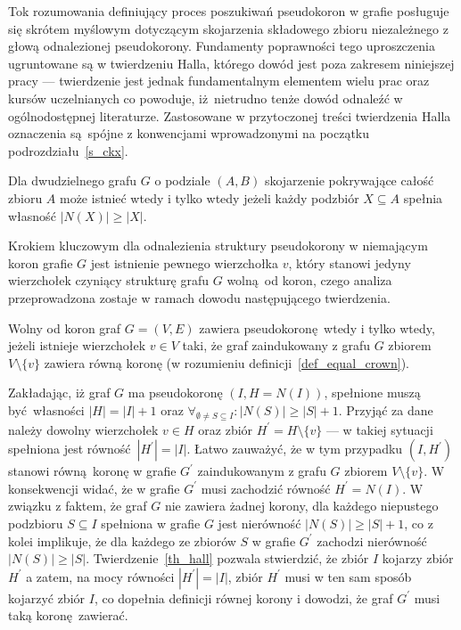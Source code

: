 \par{
  Tok rozumowania definiujący proces poszukiwań pseudokoron w grafie posługuje się skrótem myślowym dotyczącym skojarzenia składowego zbioru niezależnego z głową odnalezionej pseudokorony. 
  Fundamenty poprawności tego uproszczenia ugruntowane są w twierdzeniu Halla, którego dowód jest poza zakresem niniejszej pracy --- twierdzenie jest jednak fundamentalnym elementem wielu prac oraz kursów uczelnianych co powoduje, iż nietrudno tenże dowód odnaleźć w ogólnodostępnej literaturze.
  Zastosowane w przytoczonej treści twierdzenia Halla oznaczenia są spójne z konwencjami wprowadzonymi na początku podrozdziału~\ref{s_ckx}.
  \begin{theorem}
    Dla dwudzielnego grafu $G$ o podziale $(A, B)$ skojarzenie pokrywające całość zbioru $A$ może istnieć wtedy i tylko wtedy jeżeli każdy podzbiór $X \subseteq A$ spełnia własność $|N(X)| \geq |X|$.
  \end{theorem}

  Krokiem kluczowym dla odnalezienia struktury pseudokorony w niemającym koron grafie $G$ jest istnienie pewnego wierzchołka $v$, który stanowi jedyny wierzchołek czyniący strukturę grafu $G$ wolną od koron, czego analiza przeprowadzona zostaje w ramach dowodu następującego twierdzenia.

  \begin{theorem}
    Wolny od koron graf $G=(V, E)$ zawiera pseudokoronę wtedy i tylko wtedy, jeżeli istnieje wierzchołek $v \in V$ taki, że graf zaindukowany z grafu $G$ zbiorem $V\setminus \{v\}$ zawiera równą koronę (w rozumieniu definicji~\ref{def_equal_crown}).
  \end{theorem}
  \begin{bproof}
    Zakładając, iż graf $G$ ma pseudokoronę $(I, H=N(I))$, spełnione muszą być własności $|H| = |I| + 1$ oraz $\forall_{\emptyset\neq S \subseteq I}:{|N(S)|\geq|S|+1}$.
    Przyjąć za dane należy dowolny wierzchołek $v \in H$ oraz zbiór $H^\prime=H \setminus \{v\}$ --- w takiej sytuacji spełniona jest równość $|H^\prime|=|I|$.
    Łatwo zauważyć, że w tym przypadku $(I, H^\prime)$ stanowi równą koronę w grafie $G^\prime$ zaindukowanym z grafu $G$ zbiorem $V \setminus \{v\}$.
    W konsekwencji widać, że w grafie $G^\prime$ musi zachodzić równość $H^\prime = N(I)$.
    W związku z faktem, że graf $G$ nie zawiera żadnej korony, dla każdego niepustego podzbioru $S \subseteq I$ spełniona w grafie $G$ jest nierówność $|N(S)| \geq |S|+1$, co z kolei implikuje, że dla każdego ze zbiorów $S$  w grafie $G^\prime$ zachodzi nierówność $|N(S)| \geq |S|$.
    Twierdzenie~\ref{th_hall} pozwala stwierdzić, że zbiór $I$ kojarzy zbiór $H^\prime$ a zatem, na mocy równości $|H^\prime|=|I|$, zbiór $H^\prime$ musi w ten sam sposób kojarzyć zbiór $I$, co dopełnia definicji równej korony i dowodzi, że graf $G^\prime$ musi taką koronę zawierać.


\end{bproof}}
